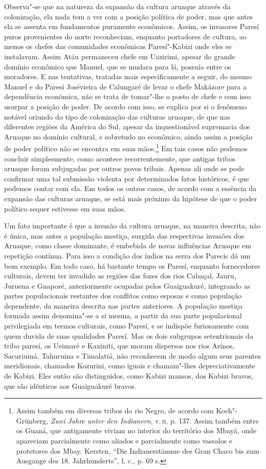 Observa"-se que na natureza da expansão da cultura aruaque através da
colonização, ela nada tem a ver com a posição política de poder, mas que
antes ela se assenta em fundamentos puramente econômicos. Assim, os
invasores Paresí puros provenientes do norte reconheciam, enquanto
portadores de cultura, ao menos os chefes das comunidades econômicas
Paresí"-Kabizi onde eles se instalavam. Assim Atáu permaneceu chefe em
Uazirimi, apesar do grande domínio econômico que Manuel, que se mudara
para lá, possuía entre os moradores. E nas tentativas, tratadas mais
especificamente a seguir, do mesmo Manuel e do Paresí Josévieira de
Calungaré de levar o chefe Makázore para a dependência econômica, não se
trata de tomar"-lhe o posto de chefe e com isso usurpar a posição de
poder. De acordo com isso, se explica por si o fenômeno notável oriundo
do tipo de colonização das culturas aruaque, de que nas diferentes
regiões da América do Sul, apesar da inquestionável supremacia dos
Aruaque no domínio cultural, e sobretudo no econômico, ainda assim a
posição de poder político não se encontra em suas mãos.\footnote{Assim
  também em diversas tribos do rio Negro, de acordo com Koch"-Grünberg,
  \emph{Zwei Jahre unter den Indianern}, v.\,\textsc{ii}, p. 137. Assim também
  entre os Guaná, que antigamente viviam no interior do território dos
  Mbayá, onde apareciam parcialmente como aliados e parcialmente como
  vassalos e protetores dos Mbay. Kersten, ``Die Indianerstämme des Gran
  Chaco bis zum Ausgange des 18. Jahrhunderts'', l. c., p. 69 s.} Em
tais casos não podemos concluir simplesmente, como acontece
recorrentemente, que antigas tribos aruaque foram subjugadas por outros
povos tribais. Apenas ali onde se pode confirmar uma tal submissão
violenta por determinados fatos históricos, é que podemos contar com
ela. Em todos os outros casos, de acordo com a essência da expansão das
culturas aruaque, se está mais próximo da hipótese de que o poder
político sequer estivesse em suas mãos.

Um fato importante é que a invasão da cultura aruaque, na maneira
descrita, não é única, mas antes a população mestiça, surgida das
respectivas invasões dos Aruaque, como classe dominante, é embebida de
novas influências Aruaque em repetição contínua. Para isso a condição
dos índios na serra dos Parecis dá um bom exemplo. Em todo caso, há
bastante tempo os Paresí, enquanto fornecedores culturais, devem ter
invadido as regiões das fozes dos rios Cabaçal, Jauru, Juruena e
Guaporé, anteriormente ocupadas pelos Guaiguakuré, integrando as partes
populacionais restantes dos conflitos como esposas e como população
dependente, da maneira descrita nas partes anteriores. A população
mestiça formada assim denomina"-se a si mesma, a partir da sua parte
populacional privilegiada em termos culturais, como Paresí, e se
indispõe furiosamente com quem duvida de suas qualidades Paresí. Mas os
dois subgrupos setentrionais da tribo paresí, os Ueimaré e Kaxiniti, que
moram dispersos nos rios Arinos, Sacuriuiná, Tahuruina e Timalatiá, não
reconhecem de modo algum seus parentes meridionais, chamados Kozurini,
como iguais e chamam"-lhes depreciativamente de Kabizi. Eles então são
distinguidos, como Kabizi mansos, dos Kabizi bravos, que são idênticos
aos Guaiguakuré bravos.

